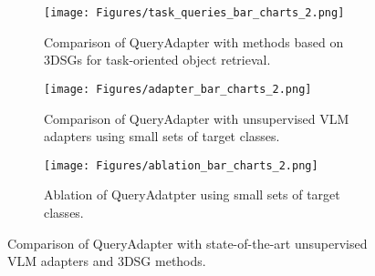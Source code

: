 \begin{figure*}[t!]
\quad
    \begin{subfigure}[t]{0.3\textwidth}
    \centering
    \texttt{[image: Figures/task\_queries\_bar\_charts\_2.png]}
    \caption{Comparison of QueryAdapter with methods based on 3DSGs for task-oriented object retrieval.}
    \end{subfigure}
\quad
    \begin{subfigure}[t]{0.3\textwidth}
    \centering
    \texttt{[image: Figures/adapter\_bar\_charts\_2.png]}
    \caption{Comparison of QueryAdapter with unsupervised VLM adapters using small sets of target classes.}
    \end{subfigure}
\quad
    \begin{subfigure}[t]{0.3\textwidth}
    \centering
    \texttt{[image: Figures/ablation\_bar\_charts\_2.png]}
    \caption{Ablation of QueryAdatpter using small sets of target classes.}
    \end{subfigure}
\caption{Comparison of QueryAdapter with state-of-the-art unsupervised VLM adapters and 3DSG methods.}
\label{comparison_results}
\vspace{-1.5em}
\end{figure*}


